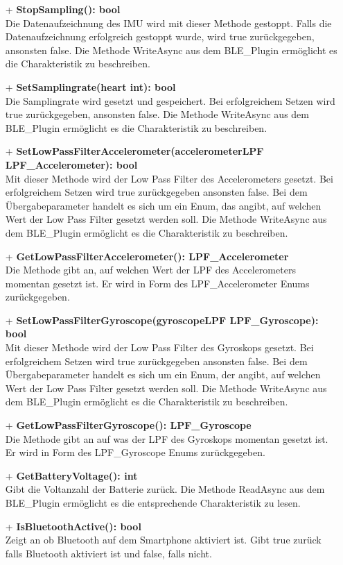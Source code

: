 \documentclass[a4paper,12pt]{article}
\begin{document}
\begin{itemize}
	\item[+] \textbf{StopSampling(): bool}\\Die Datenaufzeichnung des IMU wird mit dieser Methode gestoppt. Falls die Datenaufzeichnung erfolgreich gestoppt wurde, wird true zurückgegeben, ansonsten false. Die Methode WriteAsync aus dem BLE\_Plugin ermöglicht es die Charakteristik zu beschreiben.
	\item[+] \textbf{SetSamplingrate(heart int): bool}\\Die Samplingrate wird gesetzt und gespeichert. Bei erfolgreichem Setzen wird true zurückgegeben, ansonsten false. Die Methode WriteAsync aus dem BLE\_Plugin ermöglicht es die Charakteristik zu beschreiben.
	\item[+] \textbf{SetLowPassFilterAccelerometer(accelerometerLPF LPF\_Accelerometer): bool}\\ Mit dieser Methode wird der Low Pass Filter des Accelerometers gesetzt. Bei erfolgreichem Setzen wird true zurückgegeben ansonsten false. Bei dem Übergabeparameter handelt es sich um ein Enum, das angibt, auf welchen Wert der Low Pass Filter gesetzt werden soll. Die Methode WriteAsync aus dem BLE\_Plugin ermöglicht es die Charakteristik zu beschreiben.
	\item[+] \textbf{GetLowPassFilterAccelerometer(): LPF\_Accelerometer}\\ Die Methode gibt an, auf welchen Wert der LPF des Accelerometers momentan gesetzt ist. Er wird in Form des LPF\_Accelerometer Enums zurückgegeben. 
	\item[+] \textbf{SetLowPassFilterGyroscope(gyroscopeLPF LPF\_Gyroscope): bool}\\ Mit dieser Methode wird der Low Pass Filter des Gyroskops gesetzt. Bei erfolgreichem Setzen wird true zurückgegeben ansonsten false. Bei dem Übergabeparameter handelt es sich um ein Enum, der angibt, auf welchen Wert der Low Pass Filter gesetzt werden soll. Die Methode WriteAsync aus dem BLE\_Plugin ermöglicht es die Charakteristik zu beschreiben.
	\item[+] \textbf{GetLowPassFilterGyroscope(): LPF\_Gyroscope}\\Die Methode gibt an auf was der LPF des Gyroskops momentan gesetzt ist. Er wird in Form des LPF\_Gyroscope Enums zurückgegeben. 
	\item[+] \textbf{GetBatteryVoltage(): int}\\ Gibt die Voltanzahl der Batterie zurück. Die Methode ReadAsync aus dem BLE\_Plugin ermöglicht es die entsprechende Charakteristik zu lesen.
	\item[+] \textbf{IsBluetoothActive(): bool}\\ Zeigt an ob Bluetooth auf dem Smartphone aktiviert ist. Gibt true zurück falls Bluetooth aktiviert ist und false, falls nicht.

\end{itemize}
\end{document}
